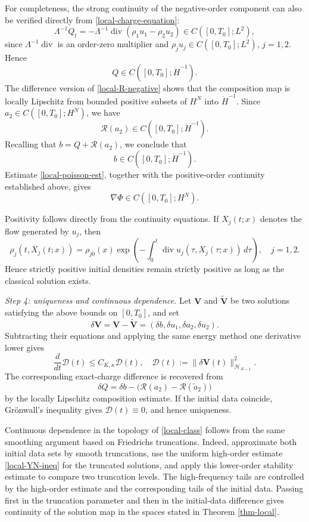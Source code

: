 \documentclass[10pt,reqno]{amsart}
\numberwithin{equation}{section}
\begin{document}
For completeness, the strong continuity of the negative-order component can also be verified directly from \eqref{local-charge-equation}:
\[
\Lambda^{-1}Q_t = -\Lambda^{-1}\operatorname{div} (\rho_1u_1-\rho_2u_2) \in C([0,T_0];L^2),
\]
since $\Lambda^{-1}\operatorname{div}$ is an order-zero multiplier and $\rho_ju_j\in C([0,T_0];L^2)$, $j=1,2$. Hence
\[
Q\in C([0,T_0];\dot H^{-1}).
\]
The difference version of \eqref{local-R-negative} shows that the composition map is locally Lipschitz from bounded positive subsets of $H^N$ into $\dot H^{-1}$. Since $a_2\in C([0,T_0];H^N)$, we have
\[
\mathcal R(a_2)
\in C([0,T_0];\dot H^{-1}).
\]
Recalling that $b=Q+\mathcal R(a_2)$, we conclude that
\[
b\in C([0,T_0];\dot H^{-1}).
\]
Estimate \eqref{local-poisson-est}, together with the positive-order continuity established above, gives
\[
\nabla\Phi\in C([0,T_0];H^N).
\]

Positivity follows directly from the continuity equations. If $X_j(t;x)$ denotes the flow generated by $u_j$, then
\[
\rho_j(t,X_j(t;x)) = \rho_{j0}(x) \exp\left( -\int_0^t \operatorname{div}u_j(\tau,X_j(\tau;x))\,d\tau \right), \quad j=1,2.
\]
Hence strictly positive initial densities remain strictly positive
as long as the classical solution exists.

\medskip
\noindent\emph{Step 4: uniqueness and continuous dependence.} Let $\mathbf V$ and $\widetilde{\mathbf V}$ be two solutions satisfying the above bounds on $[0,T_0]$, and set
\[
\delta\mathbf V = \mathbf V-\widetilde{\mathbf V} = (\delta b,\delta u_1,\delta a_2,\delta u_2).
\]
Subtracting their equations and applying the same energy method one derivative lower gives
\[
\frac{d}{dt}\mathcal D(t) \le C_{K,\kappa}\mathcal D(t), \quad \mathcal D(t) := \|\delta\mathbf V(t)\|_{\mathscr H_{N-1}}^2.
\]
The corresponding exact-charge difference is recovered from
\[
\delta Q = \delta b -\bigl(\mathcal R(a_2) -\mathcal R(\widetilde a_2)\bigr)
\]
by the locally Lipschitz composition estimate. If the initial data coincide, Gr\"onwall's inequality gives $\mathcal D(t)\equiv0$, and hence uniqueness.

Continuous dependence in the topology of \eqref{local-class} follows from the same smoothing argument based on Friedrichs truncations. Indeed, approximate both initial data sets by smooth truncations, use the uniform high-order estimate \eqref{local-YN-ineq} for the truncated solutions, and apply this lower-order stability estimate to compare two truncation levels. The high-frequency tails are controlled by the high-order estimate and the corresponding tails of the initial data. Passing first in the truncation parameter and then in the initial-data difference gives continuity of the solution map in the spaces stated in Theorem \ref{thm-local}.
\end{document}
